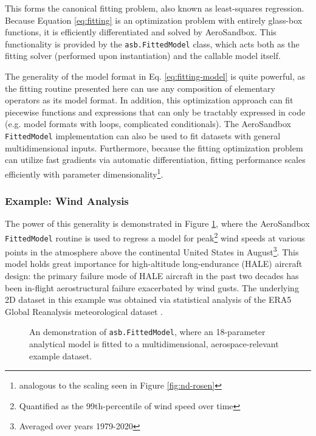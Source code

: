 This forms the canonical fitting problem, also known as least-squares regression. Because Equation \ref{eq:fitting} is an optimization problem with entirely glass-box functions, it is efficiently differentiated and solved by AeroSandbox. This functionality is provided by the \texttt{asb.FittedModel} class, which acts both as the fitting solver (performed upon instantiation) and the callable model itself.

The generality of the model format in Eq. \ref{eq:fitting-model} is quite powerful, as the fitting routine presented here can use any composition of elementary operators as its model format. In addition, this optimization approach can fit piecewise functions and expressions that can only be tractably expressed in code (e.g. model formats with loops, complicated conditionals). The AeroSandbox \texttt{FittedModel} implementation can also be used to fit datasets with general multidimensional inputs. Furthermore, because the fitting optimization problem can utilize fast gradients via automatic differentiation, fitting performance scales efficiently with parameter dimensionality\footnote{analogous to the scaling seen in Figure \ref{fig:nd-rosen}}.

\subsubsection{Example: Wind Analysis}

The power of this generality is demonstrated in Figure \ref{fig:fitting-wind}, where the AeroSandbox \texttt{FittedModel} routine is used to regress a model for peak\footnote{Quantified as the 99th-percentile of wind speed over time} wind speeds at various points in the atmosphere above the continental United States in August\footnote{Averaged over years 1979-2020}. This model holds great importance for high-altitude long-endurance (HALE) aircraft design: the primary failure mode of HALE aircraft in the past two decades has been in-flight aerostructural failure exacerbated by wind gusts. The underlying 2D dataset in this example was obtained via statistical analysis of the ERA5 Global Reanalysis meteorological dataset \cite{era5}.

\begin{figure}[H]
    \centering
%    
    \ifdraft{}{}
    \caption{An demonstration of \texttt{asb.FittedModel}, where an 18-parameter analytical model is fitted to a multidimensional, aerospace-relevant example dataset.}
    \label{fig:fitting-wind}
\end{figure}


